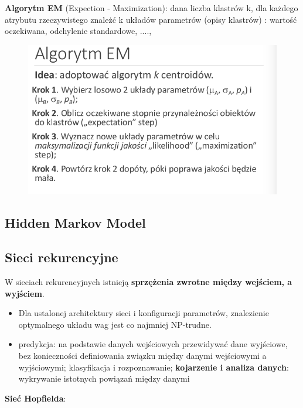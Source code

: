 \documentclass[10pt,a4paper]{article}
\begin{document}
  \textbf{Algorytm EM} (Expection - Maximization): dana liczba klastrów k, dla każdego atrybutu rzeczywistego znależć k układów parametrów (opisy klastrów) : wartość oczekiwana, odchylenie standardowe, ....,
  \begin{figure}[H]
    \centering
      \includegraphics[scale=0.50]{images/algEM.png}
  \end{figure}
\subsection{Hidden Markov Model}

\subsection{Sieci rekurencyjne}
W sieciach rekurencyjnych istnieją \textbf{sprzężenia zwrotne między wejściem, a wyjściem}.
  \begin{itemize}
    \item Dla ustalonej architektury sieci i konfiguracji parametrów, znalezienie optymalnego układu wag jest co najmniej NP-trudne.
    \item predykcja: na podstawie danych wejściowych przewidywać dane wyjściowe, bez konieczności definiowania związku między danymi wejściowymi a wyjściowymi; klasyfikacja i rozpoznawanie; \textbf{kojarzenie i analiza danych}: wykrywanie istotnych powiązań między danymi
  \end{itemize}
\textbf{Sieć Hopfielda}: %
\end{document}
